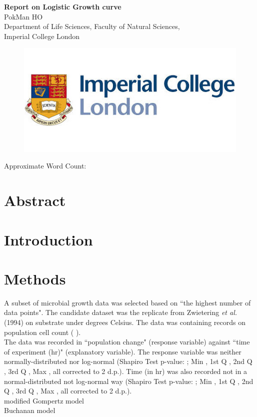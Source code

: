 \documentclass[a4paper, 11pt]{article}
\title{\ReportTitle}
\author{\ReportAuthor (CID: 01786076)}
\date{}
\newcommand{\ReportTitle}{Report on Logistic Growth curve} %
\newcommand{\ReportAuthor}{PokMan HO}
\newcommand{\ReportAffil}{Department of Life Sciences, Faculty of Natural Sciences,\\Imperial College London}
\begin{document}
	\begin{center}
		\Huge\textbf{\ReportTitle}\\
		\LARGE\ReportAuthor\\
		\Large\ReportAffil
	\end{center}
	\begin{figure}[h]
		\centering\includegraphics[width=\linewidth]{icl.jpg}
	\end{figure}
	\begin{flushright}
		\Large Approximate Word Count: %
	\end{flushright}
	\clearpage
	
	\maketitle
	\section*{Abstract}
	
	
	\section*{Introduction}
	
	
	\section*{Methods}
	A subset of microbial growth data was selected based on ``the highest number of data points".  The candidate dataset was the replicate %
	 from Zwietering \textit{et al.}(1994)\autocite{zwietering1994modeling} \textit{%
	}on %
	 substrate under %
	 degrees Celsius.  The data was containing %
	 records on population cell count (%
).\\
	The data was recorded in ``population change" (response variable) against ``time of experiment (hr)" (explanatory variable).  The response variable was neither normally-distributed nor log-normal (Shapiro Test p-value: %
	; Min
	, 1st Q
	, 2nd Q
	, 3rd Q
	, Max
	, all corrected to 2 d.p.).  Time (in hr) was also recorded not in a normal-distributed not log-normal way (Shapiro Test p-value: %
	; Min
	, 1st Q
	, 2nd Q
	, 3rd Q
	, Max
	, all corrected to 2 d.p.).\\
	modified Gompertz model\autocite{zwietering1994modeling}\\
	Buchanan model\autocite{buchanan1993differentiation}
\end{document}
